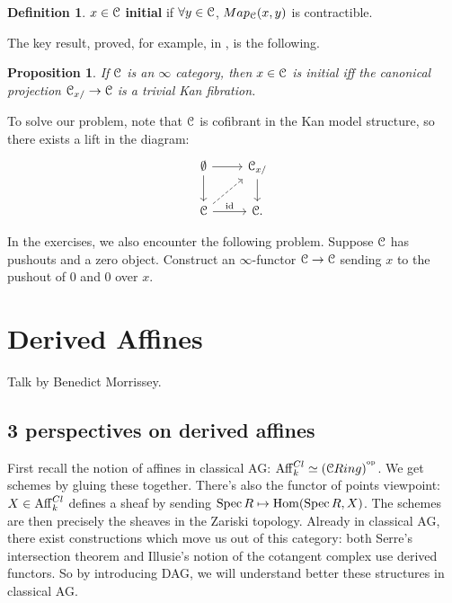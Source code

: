 \documentclass[10pt,a4paper,reqno,oneside]{book} %
\theoremstyle{plain}
\newtheorem{prop}[thm]{Proposition}
\theoremstyle{definition}
\newtheorem{defin}[thm]{Definition}
\theoremstyle{remark}
\numberwithin{equation}{section}
\begin{document}
\begin{defin}
$x \in \mathcal C$ \textbf{initial} if $\forall y \in \mathcal C$, $Map_{\mathcal C}(x,y)$ is contractible.
\end{defin}

The key result, proved, for example, in \cite{Groth}, is the following.
\begin{prop}
If $\mathcal C$ is an $\infty$ category, then $x \in \mathcal C$ is initial iff the canonical projection $\mathcal C_{x/} \to \mathcal C$ is
a trivial Kan fibration.
\end{prop}

To solve our problem, note that $\mathcal C$ is cofibrant in the Kan model structure, so there exists a lift in the diagram:
\[
\begin{tikzcd}
\emptyset\arrow{d}\arrow{r} & \cC_{x/}\arrow{d} \\
\cC \arrow{r}{\id}\arrow[dashed]{ur} & \cC .
\end{tikzcd}
\]

In the exercises, we also encounter the following problem. Suppose $\mathcal C$ has pushouts and a zero object. Construct 
an $\infty$-functor $\mathcal C \to \mathcal C$ sending $x$ to the pushout of 0 and 0 over $x$. 






\chapter{Derived Affines}
Talk by Benedict Morrissey.

\section{3 perspectives on derived affines}

First recall the notion of affines in classical AG: $\mathrm{Aff}_k^{Cl} \simeq (\mathcal C Ring)^{^\mathrm{op}}$. We get schemes by gluing these together.
There's also the functor of points viewpoint: $X \in \mathrm{Aff}_k^{Cl}$ defines a sheaf by sending $\operatorname{Spec} R \mapsto \operatorname{Hom}
(\operatorname{Spec} R, X)$. The schemes are then precisely the sheaves in the Zariski topology.  Already in classical AG, there exist 
constructions which move us out of this category: 
both Serre's intersection theorem and Illusie's notion of the cotangent complex use derived functors.
So by introducing DAG, we will understand better these structures in classical AG.
\end{document}
